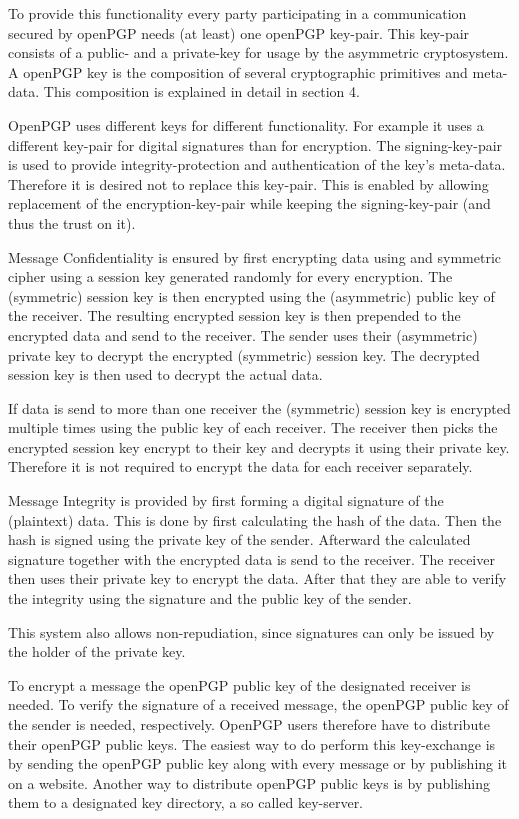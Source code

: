 To provide this functionality every party participating in a communication secured by openPGP needs (at least) one openPGP key-pair. This key-pair consists of a public- and a private-key for usage by the asymmetric cryptosystem. A openPGP key is the composition of several cryptographic primitives and meta-data. This composition is explained in detail in section 4. 

OpenPGP uses different keys for different functionality. For example it uses a different key-pair for digital signatures than for encryption. The signing-key-pair is used to provide integrity-protection and authentication of the key's meta-data. Therefore it is desired not to replace this key-pair. This is enabled by allowing replacement of the encryption-key-pair while keeping the signing-key-pair (and thus the trust on it).

Message Confidentiality is ensured by first encrypting data using and symmetric cipher using a session key generated randomly for every encryption. The (symmetric) session key is then encrypted using the (asymmetric) public key of the receiver. The resulting encrypted session key is then prepended to the encrypted data and send to the receiver. The sender uses their (asymmetric) private key to decrypt the encrypted (symmetric) session key. The decrypted session key is then used to decrypt the actual data.

If data is send to more than one receiver the (symmetric) session key is encrypted  multiple times using the public key of each receiver. The receiver then picks the encrypted session key encrypt to their key and decrypts it using their private key. Therefore it is not required to encrypt the data for each receiver separately.

Message Integrity is provided by first forming a digital signature of the (plaintext) data. This is done by first calculating the hash of the data. Then the hash is signed using the private key of the sender. Afterward the calculated signature together with the encrypted data is send to the receiver. The receiver then uses their private key to encrypt the data. After that they are able to verify the integrity using the signature and the public key of the sender.

This system also allows non-repudiation, since signatures can only be issued by the holder of the private key.


To encrypt a message the openPGP public key of the designated receiver is needed. To verify the signature of a received message, the openPGP public key of the sender is needed, respectively. OpenPGP users therefore have to distribute their openPGP public keys. The easiest way to do perform this key-exchange is by sending the openPGP public key along with every message or by publishing it on a website. Another way to distribute openPGP public keys is by publishing them to a designated key directory, a so called key-server.



